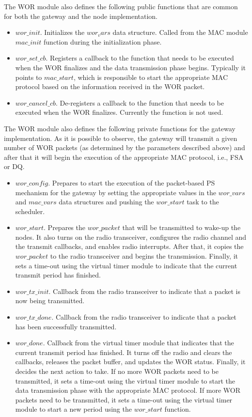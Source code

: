 The WOR module also defines the following public functions that are common for both the gateway and the node implementation.
\begin{itemize}
\item $wor\_init$. Initializes the $wor_vars$ data structure. Called from the MAC module $mac\_init$ function during the initialization phase.
\item $wor\_set\_cb$. Registers a callback to the function that needs to be executed when the WOR finalizes and the data transmission phase begins. Typically it points to $mac\_start$, which is responsible to start the appropriate MAC protocol based on the information received in the WOR packet.
\item $wor\_cancel\_cb$. De-registers a callback to the function that needs to be executed when the WOR finalizes. Currently the function is not used.
\end{itemize}

The WOR module also defines the following private functions for the gateway implementation. As it is possible to observe, the gateway will transmit a given number of WOR packets (as determined by the parameters described above) and after that it will begin the execution of the appropriate MAC protocol, i.e., FSA or DQ. 
\begin{itemize}
\item $wor\_config$. Prepares to start the execution of the packet-based PS mechanism for the gateway by setting the appropriate values in the $wor\_vars$ and $mac\_vars$ data structures and pushing the $wor\_start$ task to the scheduler.
\item $wor\_start$. Prepares the $wor\_packet$ that will be transmitted to wake-up the nodes. It also turns on the radio transceiver, configures the radio channel and the transmit callbacks, and enables radio interrupts. After that, it copies the $wor\_packet$ to the radio transceiver and begins the transmission. Finally, it sets a time-out using the virtual timer module to indicate that the current transmit period has finished.
\item $wor\_tx\_init$. Callback from the radio transceiver to indicate that a packet is now being transmitted.
\item $wor\_tx\_done$. Callback from the radio transceiver to indicate that a packet has been successfully transmitted.
\item $wor\_done$. Callback from the virtual timer module that indicates that the current transmit period has finished. It turns off the radio and clears the callbacks, releases the packet buffer, and updates the WOR status. Finally, it decides the next action to take. If no more WOR packets need to be transmitted, it sets a time-out using the virtual timer module to start the data transmission phase with the appropriate MAC protocol. If more WOR packets need to be transmitted, it sets a time-out using the virtual timer module to start a new period using the $wor\_start$ function.
\end{itemize}

